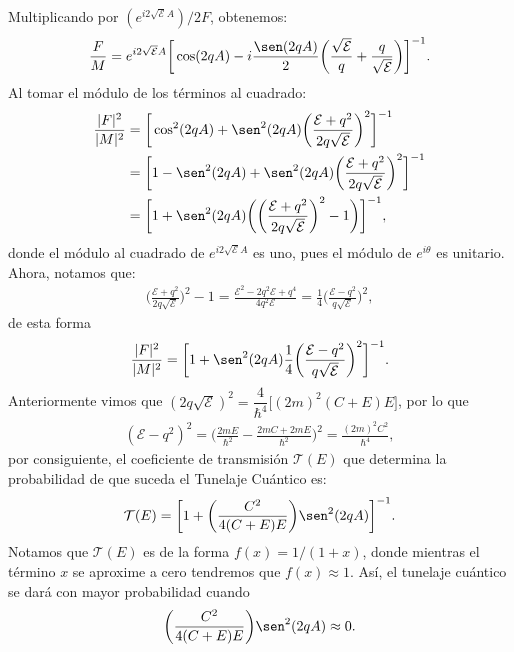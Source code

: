 \documentclass[12pt]{article}
\theoremstyle{definition}
\begin{document}
Multiplicando por $(e^{i2\sqrt{\mathcal{E}}A})/2F$, obtenemos:
\begin{align*}
    \frac{F}{M} = e^{i2\sqrt{\mathcal{E}}A}\bigg[\cos(2qA)-i\frac{\sen(2qA)}{2}\bigg(\frac{\sqrt{\mathcal{E}}}{q} + \frac{q}{\sqrt{\mathcal{E}}}
    \bigg)\bigg] ^{-1}.
\end{align*}
Al tomar el módulo de los términos al cuadrado:
\begin{align*}
    \frac{|F|^2}{|M|^2} & =
    \bigg[\cos^2(2qA)+\sen^2(2qA)\bigg(\frac{\mathcal{E}+q^2}{2q\sqrt{\mathcal{E}}}
    \bigg)^2\bigg] ^{-1}
    \\
    & =
    \bigg[1-\sen^2(2qA)+\sen^2(2qA)\bigg(\frac{\mathcal{E}+q^2}{2q\sqrt{\mathcal{E}}}
    \bigg)^2\bigg] ^{-1}
    \\
    & = 
    \bigg[1+\sen^2(2qA)\bigg(\bigg(\frac{\mathcal{E}+q^2}{2q\sqrt{\mathcal{E}}}
    \bigg)^2-1\bigg)\bigg] ^{-1},
\end{align*}
donde el módulo al cuadrado de $e^{i2\sqrt{\mathcal{E}}A}$ es uno, pues el módulo de $e^{i\theta}$ es unitario. Ahora, notamos que:
\begin{align*}
    \bigg(\frac{\mathcal{E}+q^2}{2q\sqrt{\mathcal{E}}}
    \bigg)^2 -1 = \frac{\mathcal{E}^2-2q^2\mathcal{E}+q^4}{4q^2\mathcal{E}} 
    =
    \frac{1}{4}\bigg(\frac{\mathcal{E}-q^2}{q\sqrt{\mathcal{E}}}\bigg)^2,
\end{align*}
de esta forma
\begin{align*}
    \frac{|F|^2}{|M|^2} =
    \bigg[1+\sen^2(2qA)\frac{1}{4}\bigg(\frac{\mathcal{E}-q^2}{q\sqrt{\mathcal{E}}}\bigg)^2\bigg] ^{-1}.
\end{align*}
Anteriormente vimos que $(2q\sqrt{\mathcal{E}})^2 = 
    \dfrac{4}{\hslash^4}\bigg[(2m)^2(C+E)E\bigg]$, por lo que
\begin{align*}
    (\mathcal{E}-q^2)^2 = \bigg(\frac{2mE}{\hslash^2}-\frac{2mC+2mE}{\hslash^2}\bigg)^2 =
    \frac{(2m)^2C^2}{\hslash^4},
\end{align*}
por consiguiente, el coeficiente de transmisión $\mathcal{T}(E)$ que determina la probabilidad de que suceda el Tunelaje Cuántico es:
\begin{align*}
    \mathcal{T}(E) = 
    \bigg[1+\bigg(\frac{C^2}{4(C+E)E}\bigg)\sen^2(2qA)\bigg] ^{-1}.
\end{align*}
Notamos que $\mathcal{T}(E)$ es de la forma $f(x) = 1/(1+x)$, donde mientras el término $x$ se aproxime a cero tendremos que $f(x) \approx 1$. Así, el tunelaje cuántico se dará con mayor probabilidad cuando
\begin{align*}
    \bigg(\frac{C^2}{4(C+E)E}\bigg)\sen^2(2qA) \approx 0.
\end{align*}
\end{document}
